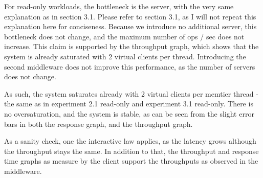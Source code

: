 \documentclass[11pt,a4paper]{article}
\begin{document}
For read-only workloads, the bottleneck is the server, with the very same explanation as in  section 3.1.
Please refer to section 3.1, as I will not repeat this explanation here for conciseness.
Because we introduce no additional server, this bottleneck does not change, and the maximum number of ops / sec does not increase.
This claim is supported by the throughput graph, which shows that the system is already saturated with 2 virtual clients per thread.
Introducing the second middleware does not improve this performance, as the number of servers does not change.

As such, the system saturates already with 2 virtual clients per memtier thread - the same as in experiment 2.1 read-only and experiment 3.1 read-only.
There is no oversaturation, and the system is stable, as can be seen from the slight error bars in both the response graph, and the throughput graph.

As a sanity check, one the interactive law applies, as the latency grows although the throughput stays the same.
In addition to that, the throughput and response time graphs as measure by the client support the throughputs as observed in the middleware.
\end{document}
